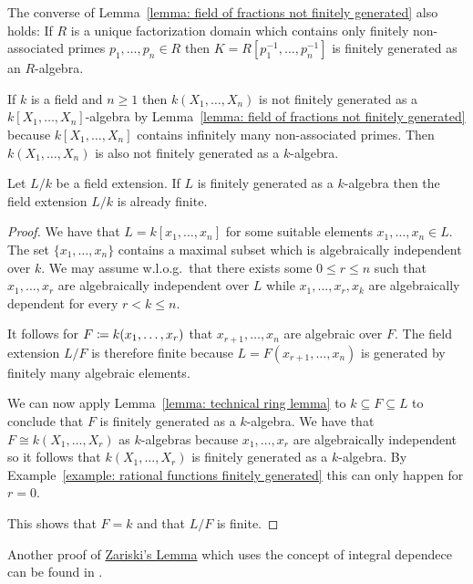 \begin{remark}
  The converse of Lemma~\ref{lemma: field of fractions not finitely generated} also holds:
  If $R$ is a unique factorization domain which contains only finitely non-associated primes $p_1, \dotsc, p_n \in R$ then $K = R[p_1^{-1}, \dotsc, p_n^{-1}]$ is finitely generated as an $R$-algebra.
\end{remark}


\begin{example}
  \label{example: rational functions finitely generated}
  If $k$ is a field and $n \geq 1$ then $k(X_1, \dotsc, X_n)$ is not finitely generated as a $k[X_1, \dotsc, X_n]$-algebra by Lemma~\ref{lemma: field of fractions not finitely generated} because $k[X_1, \dotsc, X_n]$ contains infinitely many non-associated primes.
  Then $k(X_1, \dotsc, X_n)$ is also not finitely generated as a $k$-algebra.
\end{example}


\begin{corollary}
  \label{corollary: zariskis lemma}
  Let $L/k$ be a field extension.
  If $L$ is finitely generated as a $k$-algebra then the field extension $L/k$ is already finite.
\end{corollary}


\begin{proof}
  We have that $L = k[x_1, \dotsc, x_n]$ for some suitable elements $x_1, \dotsc, x_n \in L$.
  The set $\{x_1, \dotsc, x_n\}$ contains a maximal subset which is algebraically independent over $k$.
  We may assume w.l.o.g.\ that there exists some $0 \leq r \leq n$ such that $x_1, \dotsc, x_r$ are algebraically independent over $L$ while $x_1, \dotsc, x_r, x_k$ are algebraically dependent for every $r < k \leq n$.
  
  It follows for $F \coloneqq k(x_1, \dotsc, x_r)$ that $x_{r+1}, \dotsc, x_n$ are algebraic over $F$.
  The field extension $L/F$ is therefore finite because $L = F(x_{r+1}, \dotsc, x_n)$ is generated by finitely many algebraic elements.
  
  We can now apply Lemma~\ref{lemma: technical ring lemma} to $k \subseteq F \subseteq L$ to conclude that $F$ is finitely generated as a $k$-algebra.
  We have that $F \cong k(X_1, \dotsc, X_r)$ as $k$-algebras because $x_1, \dotsc, x_r$ are algebraically independent so it follows that $k(X_1, \dotsc, X_r)$ is finitely generated as a $k$-algebra.
  By Example~\ref{example: rational functions finitely generated} this can only happen for $r = 0$.
  
  This shows that $F = k$ and that $L/F$ is finite.
\end{proof}


\begin{remark}
  Another proof of \hyperref[corollary: zariskis lemma]{Zariski’s Lemma} which uses the concept of integral dependece can be found in \cite[Corollary 5.24]{AtiyahMacdonald}.
\end{remark}

